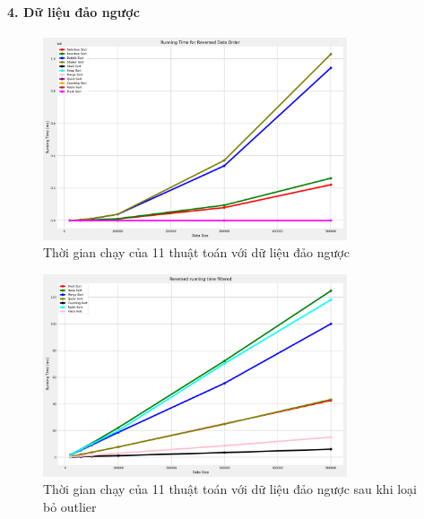 \paragraph{4. Dữ liệu đảo ngược}
\begin{figure}[H]
    \centering
    \includegraphics[width=0.8\textwidth]{exprimental_result/images/reversed_running_time.png}
    \caption{Thời gian chạy của 11 thuật toán với dữ liệu đảo ngược}
\end{figure}

\begin{figure}[H]
    \centering
    \includegraphics[width=0.8\textwidth]{exprimental_result/images/reversed_running_time_filtered.png}
    \caption{
        Thời gian chạy của 11 thuật toán với dữ liệu đảo ngược sau khi loại bỏ outlier
    }
\end{figure}











